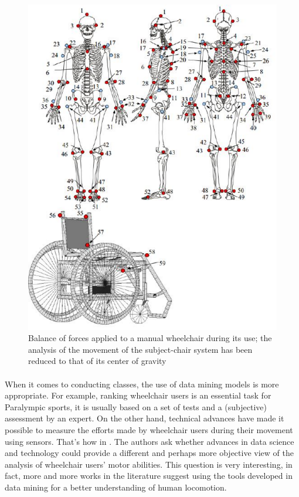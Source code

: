 \begin{itemize}
\begin{figure}[h]
\center
\includegraphics[scale = 0.6]{images/squelette}
\caption{Balance of forces applied to a manual wheelchair during its use; the analysis of the movement of the subject-chair system has been reduced to that of its center of gravity }
\label{Wheelchair_model}
\end{figure}

\end{itemize}


\paragraph{} When it comes to conducting classes, the use of data mining models is more appropriate. For example, ranking wheelchair users is an essential task for Paralympic sports, it is usually based on a set of tests and a (subjective) assessment by an expert. On the other hand, technical advances have made it possible to measure the efforts made by wheelchair users during their movement using sensors. That's how in \cite{van2017future}. The authors ask whether advances in data science and technology could provide a different and perhaps more objective view of the analysis of wheelchair users' motor abilities. This question is very interesting, in fact, more and more works in the literature suggest using the tools developed in data mining for a better understanding of human locomotion. 

